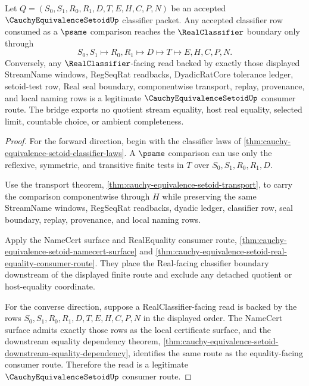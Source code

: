 \begin{theorem}
\label{thm:cauchy-equivalence-setoid-psame-real-classifier-bridge}
Let $Q=(S_0,S_1,R_0,R_1,D,T,E,H,C,P,N)$ be an accepted $\CauchyEquivalenceSetoidUp$ classifier packet. Any accepted classifier row consumed as a $\psame$ comparison reaches the $\RealClassifier$ boundary only through
$$
S_0,S_1 \longmapsto R_0,R_1 \longmapsto D \longmapsto T \longmapsto E,H,C,P,N .
$$
Conversely, any $\RealClassifier$-facing read backed by exactly those displayed StreamName windows, RegSeqRat readbacks, DyadicRatCore tolerance ledger, setoid-test row, Real seal boundary, componentwise transport, replay, provenance, and local naming rows is a legitimate $\CauchyEquivalenceSetoidUp$ consumer route. The bridge exports no quotient stream equality, host real equality, selected limit, countable choice, or ambient completeness.
\end{theorem}
\begin{proof}
For the forward direction, begin with the classifier laws of \autoref{thm:cauchy-equivalence-setoid-classifier-laws}. A $\psame$ comparison can use only the reflexive, symmetric, and transitive finite tests in $T$ over $S_0,S_1,R_0,R_1,D$.

Use the transport theorem, \autoref{thm:cauchy-equivalence-setoid-transport}, to carry the comparison componentwise through $H$ while preserving the same StreamName windows, RegSeqRat readbacks, dyadic ledger, classifier row, seal boundary, replay, provenance, and local naming rows.

Apply the NameCert surface and RealEquality consumer route, \autoref{thm:cauchy-equivalence-setoid-namecert-surface} and \autoref{thm:cauchy-equivalence-setoid-real-equality-consumer-route}. They place the Real-facing classifier boundary downstream of the displayed finite route and exclude any detached quotient or host-equality coordinate.

For the converse direction, suppose a RealClassifier-facing read is backed by the rows $S_0,S_1,R_0,R_1,D,T,E,H,C,P,N$ in the displayed order. The NameCert surface admits exactly those rows as the local certificate surface, and the downstream equality dependency theorem, \autoref{thm:cauchy-equivalence-setoid-downstream-equality-dependency}, identifies the same route as the equality-facing consumer route. Therefore the read is a legitimate $\CauchyEquivalenceSetoidUp$ consumer route.
\end{proof}

